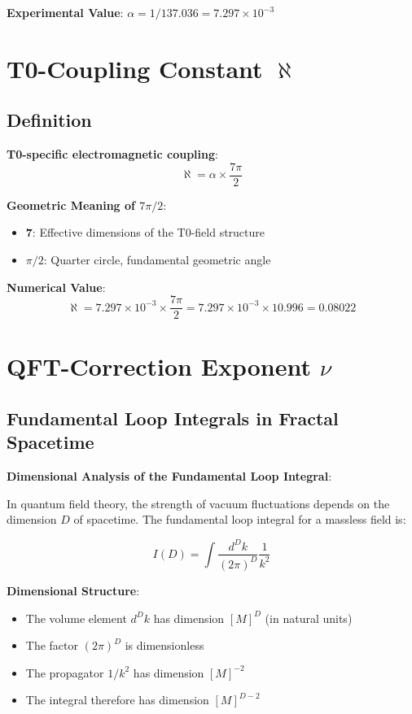\documentclass[12pt,a4paper]{article}
\newcommand{\alphagem}{\alpha}
\newcommand{\nulep}{\nu}
\begin{document}
	\textbf{Experimental Value}: $\alphagem = 1/137{.}036 = 7{.}297 \times 10^{-3}$
	
	\section{T0-Coupling Constant $\aleph$}
	
	\subsection{Definition}
	
	\textbf{T0-specific electromagnetic coupling}:
	\begin{equation}
		\aleph = \alphagem \times \frac{7\pi}{2}
	\end{equation}
	
	\textbf{Geometric Meaning of $7\pi/2$}:
	\begin{itemize}
		\item \textbf{7}: Effective dimensions of the T0-field structure
		\item \textbf{$\pi/2$}: Quarter circle, fundamental geometric angle
	\end{itemize}
	
	\textbf{Numerical Value}:
	\begin{equation}
		\aleph = 7{.}297 \times 10^{-3} \times \frac{7\pi}{2} = 7{.}297 \times 10^{-3} \times 10{.}996 = 0{.}08022
	\end{equation}
	
	\section{QFT-Correction Exponent $\nulep$}
	
	\subsection{Fundamental Loop Integrals in Fractal Spacetime}
	
	\textbf{Dimensional Analysis of the Fundamental Loop Integral}:
	
	In quantum field theory, the strength of vacuum fluctuations depends on the dimension $D$ of spacetime. The fundamental loop integral for a massless field is:
	
	\begin{equation}
		I(D) = \int \frac{d^D k}{(2\pi)^D} \frac{1}{k^2}
	\end{equation}
	
	\textbf{Dimensional Structure}:
	\begin{itemize}
		\item The volume element $d^D k$ has dimension $[M]^D$ (in natural units)
		\item The factor $(2\pi)^D$ is dimensionless
		\item The propagator $1/k^2$ has dimension $[M]^{-2}$
		\item The integral therefore has dimension $[M]^{D-2}$
	\end{itemize}
	
\end{document}
